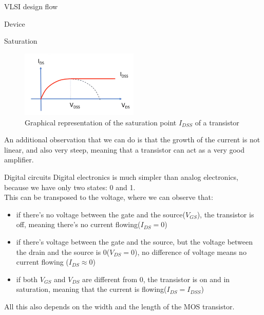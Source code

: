 \begin{section}{VLSI design flow}
\begin{subsection}{Device}
\begin{subsubsection}{Saturation}
\begin{equation}
        \label{eq:saturation}
      \end{equation}
      \begin{figure}[h]
        \centering
        \includegraphics[width=0.5\textwidth]{img/hardware/saturation.png}
        \caption{Graphical representation of the saturation point $I_{DSS}$ of  a transistor}
        \label{fig:saturation}
      \end{figure}
      An additional observation that we can do is that the growth of the current is not linear, and 
      also very steep, meaning that a transistor can act as a very good amplifier.\\
    \end{subsubsection}
    \begin{subsubsection}{Digital circuits}
      Digital electronics is much simpler than analog electronics, because we have only two states:
      0 and 1.\\
      This can be transposed to the voltage, where we can observe that:
      \begin{itemize}
        \item if there's no voltage between the gate and the source($V_{GS}$), the transistor is off,
          meaning there's no current flowing($I_{DS} = 0$)
        \item if there's voltage between the gate and the source, but the voltage between the drain
          and the source is 0($V_{DS} = 0$), no difference of voltage means no current flowing
          ($I_{DS} \approx 0$)
        \item if both $V_{GS}$ and $V_{DS}$ are different from 0, the transistor is on and 
          in saturation, meaning that the current is flowing($I_{DS} = I_{DSS}$)
      \end{itemize}
      All this also depends on the width and the length of the MOS transistor.
    \end{subsubsection}



\end{subsection}
\end{section}
